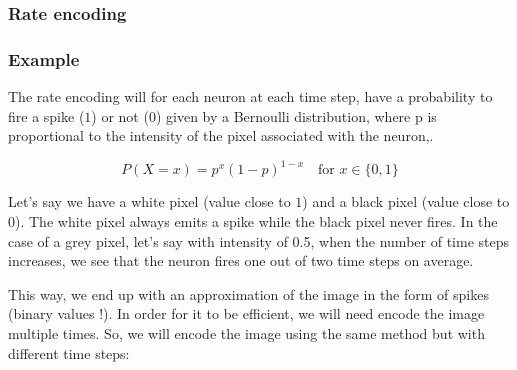 \documentclass[11pt]{article}
\begin{document}
\subsubsection{Rate encoding}

\subsubsection*{Example}

The rate encoding will for each neuron at each time step, have a probability to fire a spike ($1$) or not ($0$) given by a Bernoulli distribution, where p is proportional to the intensity of the pixel associated with the neuron,. 


$$P(X = x) = p^x (1 - p)^{1-x} \quad \text{for } x \in \{0, 1\}$$ 



Let's say we have a white pixel (value close to $1$) and a black pixel (value close to $0$). The white pixel always emits a spike while the black pixel never fires. In the case of a grey pixel, let's say with intensity of 0.5, when the number of time steps increases, we see that the neuron fires one out of two time steps on average.

This way, we end up with an approximation of the image in the form of spikes (binary values !). In order for it to be efficient, we will need encode the image multiple times. So, we will encode the image using the same method but with different time steps:
\end{document}
